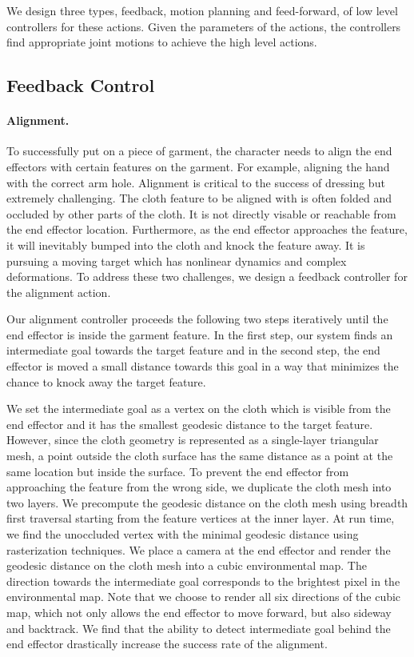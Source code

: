 We design three types, feedback, motion planning and feed-forward, of low level controllers for these actions. Given the parameters of the actions, the controllers find appropriate joint motions to achieve the high level actions.

\subsection{Feedback Control}
\paragraph{Alignment.} To successfully put on a piece of garment, the character needs to align the end effectors with certain features on the garment. For example, aligning the hand with the correct arm hole. Alignment is critical to the success of dressing but extremely challenging. The cloth feature to be aligned with is often folded and occluded by other parts of the cloth. It is not directly visable or reachable from the end effector location. Furthermore, as the end effector approaches the feature, it will inevitably bumped into the cloth and knock the feature away. It is pursuing a moving target which has nonlinear dynamics and complex deformations. To address these two challenges, we design a feedback controller for the alignment action.

Our alignment controller proceeds the following two steps iteratively until the end effector is inside the garment feature. In the first step, our system finds an intermediate goal towards the target feature and in the second step, the end effector is moved a small distance towards this goal in a way that minimizes the chance to knock away the target feature.

We set the intermediate goal as a vertex on the cloth which is visible from the end effector and it has the smallest geodesic distance to the target feature. However, since the cloth geometry is represented as a single-layer triangular mesh, a point outside the cloth surface has the same distance as a point at the same location but inside the surface. To prevent the end effector from approaching the feature from the wrong side, we duplicate the cloth mesh into two layers.  We precompute the geodesic distance on the cloth mesh using breadth first traversal starting from the feature vertices at the inner layer. At run time, we find the unoccluded vertex with the minimal geodesic distance using rasterization techniques. We place a camera at the end effector and render the geodesic distance on the  cloth mesh into a cubic environmental map. The direction towards the intermediate goal corresponds to the brightest pixel in the environmental map. Note that we choose to render all six directions of the cubic map, which not only allows the end effector to move forward, but also sideway and backtrack. We find that the ability to detect intermediate goal behind the end effector drastically increase the success rate of the alignment.

